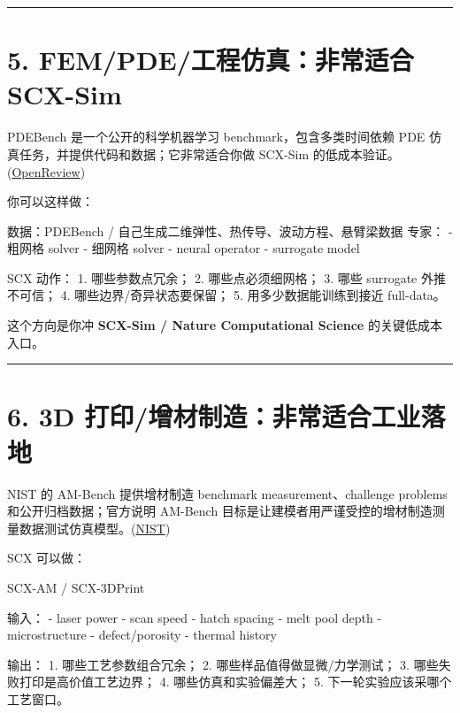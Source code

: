 \documentclass[
  12pt,
]{ctexart}
\newenvironment{Shaded}{}{}
\newcommand{\NormalTok}[1]{#1}
\begin{document}
\begin{center}\rule{0.5\linewidth}{0.5pt}\end{center}

\section{5. FEM/PDE/工程仿真：非常适合
SCX-Sim}\label{fempdeux5de5ux7a0bux4effux771fux975eux5e38ux9002ux5408-scx-sim}

PDEBench 是一个公开的科学机器学习 benchmark，包含多类时间依赖 PDE
仿真任务，并提供代码和数据；它非常适合你做 SCX-Sim
的低成本验证。(\href{https://openreview.net/forum?id=dh_MkX0QfrK&utm_source=chatgpt.com}{OpenReview})

你可以这样做：

\begin{Shaded}
\begin{Highlighting}[]
\NormalTok{数据：PDEBench / 自己生成二维弹性、热传导、波动方程、悬臂梁数据}
\NormalTok{专家：}
\NormalTok{{-} 粗网格 solver}
\NormalTok{{-} 细网格 solver}
\NormalTok{{-} neural operator}
\NormalTok{{-} surrogate model}

\NormalTok{SCX 动作：}
\NormalTok{1. 哪些参数点冗余；}
\NormalTok{2. 哪些点必须细网格；}
\NormalTok{3. 哪些 surrogate 外推不可信；}
\NormalTok{4. 哪些边界/奇异状态要保留；}
\NormalTok{5. 用多少数据能训练到接近 full{-}data。}
\end{Highlighting}
\end{Shaded}

这个方向是你冲 \textbf{SCX-Sim / Nature Computational Science}
的关键低成本入口。

\begin{center}\rule{0.5\linewidth}{0.5pt}\end{center}

\section{6. 3D
打印/增材制造：非常适合工业落地}\label{d-ux6253ux5370ux589eux6750ux5236ux9020ux975eux5e38ux9002ux5408ux5de5ux4e1aux843dux5730-1}

NIST 的 AM-Bench 提供增材制造 benchmark measurement、challenge problems
和公开归档数据；官方说明 AM-Bench
目标是让建模者用严谨受控的增材制造测量数据测试仿真模型。(\href{https://www.nist.gov/ambench?utm_source=chatgpt.com}{NIST})

SCX 可以做：

\begin{Shaded}
\begin{Highlighting}[]
\NormalTok{SCX{-}AM / SCX{-}3DPrint}

\NormalTok{输入：}
\NormalTok{{-} laser power}
\NormalTok{{-} scan speed}
\NormalTok{{-} hatch spacing}
\NormalTok{{-} melt pool depth}
\NormalTok{{-} microstructure}
\NormalTok{{-} defect/porosity}
\NormalTok{{-} thermal history}

\NormalTok{输出：}
\NormalTok{1. 哪些工艺参数组合冗余；}
\NormalTok{2. 哪些样品值得做显微/力学测试；}
\NormalTok{3. 哪些失败打印是高价值工艺边界；}
\NormalTok{4. 哪些仿真和实验偏差大；}
\NormalTok{5. 下一轮实验应该采哪个工艺窗口。}
\end{Highlighting}
\end{Shaded}
\end{document}
